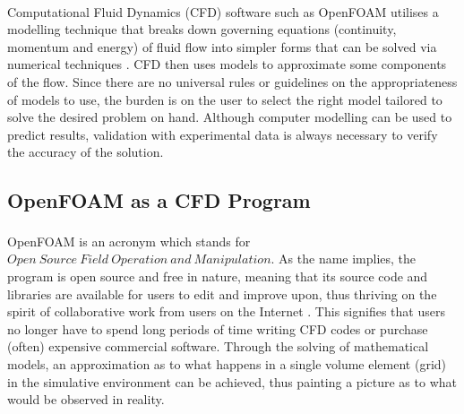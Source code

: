 Computational Fluid Dynamics (CFD) software such as OpenFOAM\textsuperscript{\textregistered} utilises a modelling technique that breaks down governing equations (continuity, momentum and energy) of fluid flow into simpler forms that can be solved via numerical techniques \cite{Blocken2004}. CFD then uses models to approximate some components of the flow. Since there are no universal rules or guidelines on the appropriateness of models to use, the burden is on the user to select the right model tailored to solve the desired problem on hand. Although computer modelling can be used to predict results, validation with experimental data is always necessary to verify the accuracy of the solution.
\subsection{OpenFOAM as a CFD Program}
OpenFOAM\textsuperscript{\textregistered} is an acronym which stands for $Open\:Source\:Field\:Operation\:and\:Manipulation$. As the name implies, the program is open source and free in nature, meaning that its source code and libraries are available for users to edit and improve upon, thus thriving on the spirit of collaborative work from users on the Internet \cite{Chen2014}. This signifies that users no longer have to spend long periods of time writing CFD codes or purchase (often) expensive commercial software. Through the solving of mathematical models, an approximation as to what happens in a single volume element (grid) in the simulative environment can be achieved, thus painting a picture as to what would be observed in reality.

